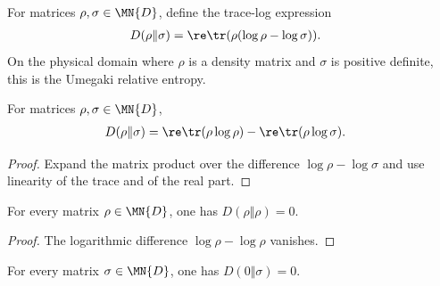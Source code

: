 \begin{definition}\label{def:quantum_relative_entropy}
    \leanok
    For matrices $\rho,\sigma\in\MN{D}$, define the trace-log expression
    \begin{align}
        D(\rho\Vert\sigma)
         & =\re\tr(\rho(\log\rho-\log\sigma)).
        \label{eq:entropy_relative_definition}
    \end{align}
    On the physical domain where $\rho$ is a density matrix and $\sigma$ is
    positive definite, this is the Umegaki relative entropy.
\end{definition}

\begin{lemma}
    \label{lem:quantum_relative_entropy_trace_split}
    \leanok
    For matrices $\rho,\sigma\in\MN{D}$,
    \begin{align}
        D(\rho\Vert\sigma)
         & =\re\tr(\rho\log\rho)-\re\tr(\rho\log\sigma).
        \label{eq:entropy_relative_split}
    \end{align}
\end{lemma}

\begin{proof}\leanok
    Expand the matrix product over the difference $\log\rho-\log\sigma$ and use
    linearity of the trace and of the real part.
\end{proof}

\begin{lemma}
    \label{lem:quantum_relative_entropy_self}
    \leanok
    For every matrix $\rho\in\MN{D}$, one has $D(\rho\Vert\rho)=0$.
\end{lemma}

\begin{proof}\leanok
    The logarithmic difference $\log\rho-\log\rho$ vanishes.
\end{proof}

\begin{lemma}
    \label{lem:quantum_relative_entropy_zero_left}
    \leanok
    For every matrix $\sigma\in\MN{D}$, one has $D(0\Vert\sigma)=0$.
\end{lemma}

